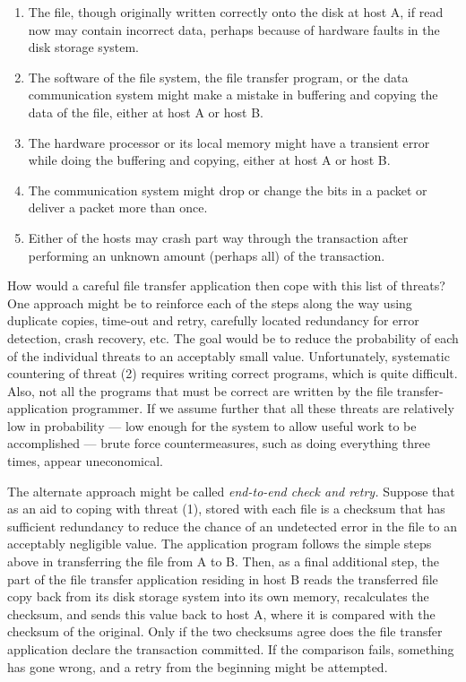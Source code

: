 \documentclass[a4paper,11pt,notitlepage,twoside,openright]{article}
\begin{document}
\begin{enumerate}[label=(\arabic*)]
\item

  The file, though originally written correctly onto the disk at host A,
  if read now may contain incorrect data, perhaps because of hardware
  faults in the disk storage system.

\item

  The software of the file system, the file transfer program, or the
  data communication system might make a mistake in buffering and
  copying the data of the file, either at host A or host B.

\item

  The hardware processor or its local memory might have a transient
  error while doing the buffering and copying, either at host A or host
  B.

\item

  The communication system might drop or change the bits in a packet or
  deliver a packet more than once.

\item

  Either of the hosts may crash part way through the transaction after
  performing an unknown amount (perhaps all) of the transaction.

\end{enumerate}

How would a careful file transfer application then cope with this list
of threats? One approach might be to reinforce each of the steps along
the way using duplicate copies, time-out and retry, carefully located
redundancy for error detection, crash recovery, etc. The goal would be
to reduce the probability of each of the individual threats to an
acceptably small value. Unfortunately, systematic countering of threat
(2) requires writing correct programs, which is quite difficult. Also,
not all the programs that must be correct are written by the file
transfer-application programmer. If we assume further that all these
threats are relatively low in probability --- low enough for the system
to allow useful work to be accomplished --- brute force
countermeasures, such as doing everything three times, appear
uneconomical.


The alternate approach might be called \emph{end-to-end check and
retry.} Suppose that as an aid to coping with threat (1), stored with
each file is a checksum that has sufficient redundancy to reduce the
chance of an undetected error in the file to an acceptably negligible
value. The application program follows the simple steps above in
transferring the file from A to B. Then, as a final additional step, the
part of the file transfer application residing in host B reads the
transferred file copy back from its disk storage system into its own
memory, recalculates the checksum, and sends this value back to host A,
where it is compared with the checksum of the original. Only if the two
checksums agree does the file transfer application declare the
transaction committed. If the comparison fails, something has gone
wrong, and a retry from the beginning might be attempted.
\end{document}
